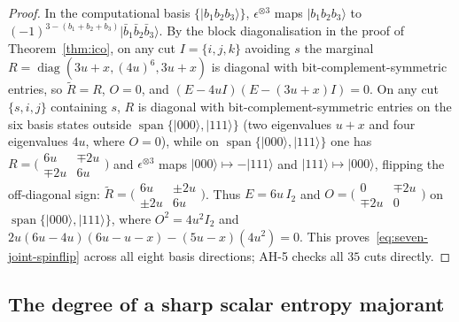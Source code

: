 \begin{proof}
In the computational basis $\{|b_1b_2b_3\rangle\}$, $\epsilon^{\otimes3}$ maps $|b_1b_2b_3\rangle$ to $(-1)^{3-(b_1+b_2+b_3)}|\bar b_1\bar b_2\bar b_3\rangle$.
By the block diagonalisation in the proof of Theorem~\ref{thm:ico}, on any cut $I=\{i,j,k\}$ avoiding $s$ the marginal $R=\operatorname{diag}(3u+x,(4u)^6,3u+x)$ is diagonal with bit-complement-symmetric entries, so $\widetilde R=R$, $O=0$, and $(E-4uI)(E-(3u+x)I)=0$.
On any cut $\{s,i,j\}$ containing $s$, $R$ is diagonal with bit-complement-symmetric entries on the six basis states outside $\operatorname{span}\{|000\rangle,|111\rangle\}$ (two eigenvalues $u+x$ and four eigenvalues $4u$, where $O=0$), while on $\operatorname{span}\{|000\rangle,|111\rangle\}$ one has $R=\bigl(\begin{smallmatrix}6u&\mp2u\\\mp2u&6u\end{smallmatrix}\bigr)$ and $\epsilon^{\otimes3}$ maps $|000\rangle\mapsto-|111\rangle$ and $|111\rangle\mapsto|000\rangle$, flipping the off-diagonal sign: $\widetilde R=\bigl(\begin{smallmatrix}6u&\pm2u\\\pm2u&6u\end{smallmatrix}\bigr)$. Thus $E=6u\,I_2$ and $O=\bigl(\begin{smallmatrix}0&\mp2u\\\mp2u&0\end{smallmatrix}\bigr)$ on $\operatorname{span}\{|000\rangle,|111\rangle\}$, where $O^2=4u^2I_2$ and $2u(6u-4u)(6u-u-x)-(5u-x)(4u^2)=0$. This proves~\eqref{eq:seven-joint-spinflip} across all eight basis directions; AH-5 checks all $35$ cuts directly.
\end{proof}

\subsection{The degree of a sharp scalar entropy majorant}
\label{sec:seven-entropy-majorant-degree}

